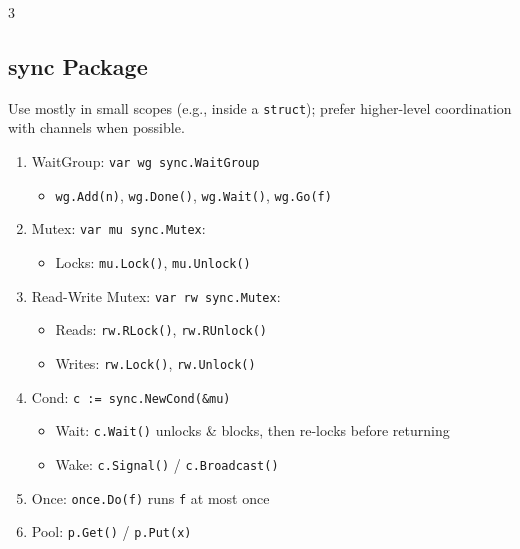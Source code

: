 \documentclass[12pt, a4paper]{article}
\begin{document}
\begin{multicols*}{3}
\subsection{sync Package}
Use mostly in small scopes (e.g., inside a \lstinline|struct|); prefer higher-level coordination with channels when possible.
\begin{enumerate}[\roman*.]
  \item WaitGroup: \lstinline|var wg sync.WaitGroup| 
    \begin{itemize}[leftmargin=*]\vspace{3pt}
      \item \lstinline|wg.Add(n)|, \lstinline|wg.Done()|, \lstinline|wg.Wait()|, \lstinline|wg.Go(f)|
    \end{itemize}
  \item Mutex: \lstinline|var mu sync.Mutex|:
    \begin{itemize}[leftmargin=*]\vspace{3pt}
      \item Locks: \lstinline|mu.Lock()|, \lstinline|mu.Unlock()|
    \end{itemize}
  \item Read-Write Mutex: \lstinline|var rw sync.Mutex|:
    \begin{itemize}[leftmargin=*]\vspace{3pt}
      \item Reads: \lstinline|rw.RLock()|, \lstinline|rw.RUnlock()|
      \item Writes: \lstinline|rw.Lock()|, \lstinline|rw.Unlock()|
    \end{itemize}
  \item Cond: \lstinline|c := sync.NewCond(&mu)|
    \begin{itemize}[leftmargin=*]\vspace{3pt}
      \item Wait: \lstinline|c.Wait()| unlocks \& blocks, then re-locks before returning
      \item Wake: \lstinline|c.Signal()| / \lstinline|c.Broadcast()|
    \end{itemize}
  \item Once: \lstinline|once.Do(f)| runs \lstinline|f| at most once
  \item Pool: \lstinline|p.Get()| / \lstinline|p.Put(x)|
\end{enumerate}

\colbreak

\end{multicols*}
\end{document}
